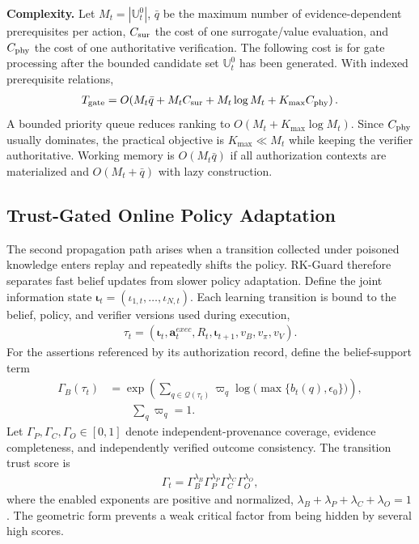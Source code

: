 \noindent\textbf{Complexity.}
Let $M_t=|\mathbb{U}_t^0|$, $\bar q$ be the maximum number of evidence-dependent prerequisites per action, $C_{\rm sur}$ the cost of one surrogate/value evaluation, and $C_{\rm phy}$ the cost of one authoritative verification. The following cost is for gate processing after the bounded candidate set $\mathbb U_t^0$ has been generated. With indexed prerequisite relations,
\begin{align}
\label{eq-complexity-risk-gate}
T_{\rm gate}=O\!\left(M_t\bar q+M_tC_{\rm sur}+M_t\log M_t+K_{\max}C_{\rm phy}\right).
\end{align}
A bounded priority queue reduces ranking to $O(M_t+K_{\max}\log M_t)$. Since $C_{\rm phy}$ usually dominates, the practical objective is $K_{\max}\ll M_t$ while keeping the verifier authoritative. Working memory is $O(M_t\bar q)$ if all authorization contexts are materialized and $O(M_t+\bar q)$ with lazy construction.

\subsection{Trust-Gated Online Policy Adaptation}
\label{subsec-trust-policy}
The second propagation path arises when a transition collected under poisoned knowledge enters replay and repeatedly shifts the policy. RK-Guard therefore separates fast belief updates from slower policy adaptation. Define the joint information state $\boldsymbol\iota_t=(\iota_{1,t},\ldots,\iota_{N,t})$. Each learning transition is bound to the belief, policy, and verifier versions used during execution,
\begin{align}
\label{eq-versioned-transition}
\tau_t=(\boldsymbol\iota_t,\mathbf{a}^{exec}_t,R_t,\boldsymbol\iota_{t+1},v_B,v_\pi,v_V).
\end{align}
For the assertions referenced by its authorization record, define the belief-support term
\begin{align}
\label{eq-transition-belief-trust}
\Gamma_B(\tau_t)&=
\exp\left(\sum_{q\in\mathcal{Q}(\tau_t)}\varpi_q
\log\big(\max\{b_t(q),\epsilon_0\}\big)\right),\nonumber\\
&\qquad \sum_q\varpi_q=1.
\end{align}
Let $\Gamma_P,\Gamma_C,\Gamma_O\in[0,1]$ denote independent-provenance coverage, evidence completeness, and independently verified outcome consistency. The transition trust score is
\begin{align}
\label{eq-transition-trust}
\Gamma_t=\Gamma_B^{\lambda_B}\Gamma_P^{\lambda_P}
\Gamma_C^{\lambda_C}\Gamma_O^{\lambda_O},
\end{align}
where the enabled exponents are positive and normalized, $\lambda_B+\lambda_P+\lambda_C+\lambda_O=1$. The geometric form prevents a weak critical factor from being hidden by several high scores.

